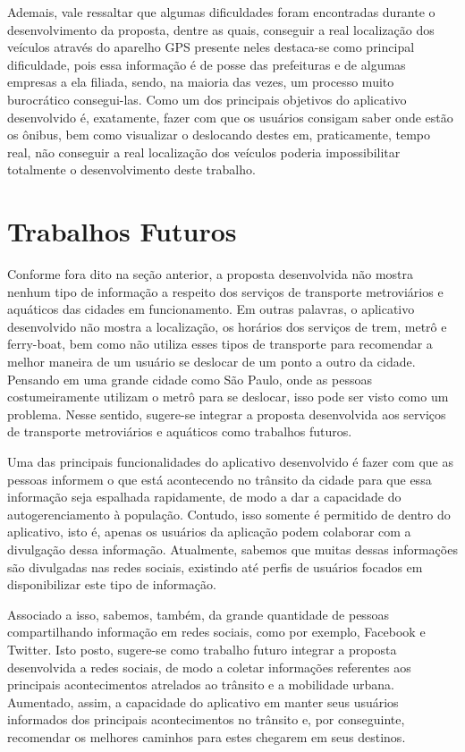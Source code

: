 Ademais, vale ressaltar que algumas dificuldades foram encontradas durante o desenvolvimento da proposta, dentre as quais, conseguir a real localização dos veículos através do aparelho GPS presente neles destaca-se como principal dificuldade, pois essa informação é de posse das prefeituras e de algumas empresas a ela filiada, sendo, na maioria das vezes, um processo muito burocrático consegui-las. Como um dos principais objetivos do aplicativo desenvolvido é, exatamente, fazer com que os usuários consigam saber onde estão os ônibus, bem como visualizar o deslocando destes em, praticamente, tempo real, não conseguir a real localização dos veículos poderia impossibilitar totalmente o desenvolvimento deste trabalho.


\section{Trabalhos Futuros}
\label{sc:trabalhosFuturos}

Conforme fora dito na seção anterior, a proposta desenvolvida não mostra nenhum tipo de informação a respeito dos serviços de transporte metroviários e aquáticos das cidades em funcionamento. Em outras palavras, o aplicativo desenvolvido não mostra a localização, os horários dos serviços de trem, metrô e ferry-boat, bem como não utiliza esses tipos de transporte para recomendar a melhor maneira de um usuário se deslocar de um ponto a outro da cidade. Pensando em uma grande cidade como São Paulo, onde as pessoas costumeiramente utilizam o metrô para se deslocar, isso pode ser visto como um problema. Nesse sentido, sugere-se integrar a proposta desenvolvida aos serviços de transporte metroviários e aquáticos como trabalhos futuros.

Uma das principais funcionalidades do aplicativo desenvolvido é fazer com que as pessoas informem o que está acontecendo no trânsito da cidade para que essa informação seja espalhada rapidamente, de modo a dar a capacidade do autogerenciamento à população. Contudo, isso somente é permitido de dentro do aplicativo, isto é, apenas os usuários da aplicação podem colaborar com a divulgação dessa informação. Atualmente, sabemos que muitas dessas informações são divulgadas nas redes sociais, existindo até perfis de usuários focados em disponibilizar este tipo de informação. 

Associado a isso, sabemos, também, da grande quantidade de pessoas compartilhando informação em redes sociais, como por exemplo, Facebook e Twitter. Isto posto, sugere-se como trabalho futuro integrar a proposta desenvolvida a redes sociais, de modo a coletar informações referentes aos principais acontecimentos atrelados ao trânsito e a mobilidade urbana. Aumentado, assim, a capacidade do aplicativo em manter seus usuários informados dos principais acontecimentos no trânsito e, por conseguinte, recomendar os melhores caminhos para estes chegarem em seus destinos.
